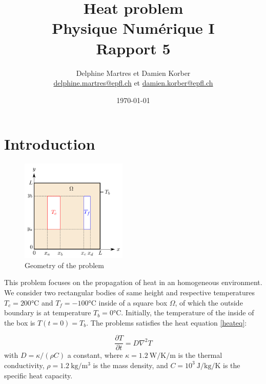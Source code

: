 \documentclass[a4paper,12pt,twoside]{article}
\newcommand{\mail}[1]{{\href{mailto:#1}{#1}}}
\begin{document}
\title{Heat problem\\{\small Physique Numérique I}\\{\small Rapport 5}}
\date{\today}
\author{Delphine Martres et Damien Korber\\{\small \mail{delphine.martres@epfl.ch} et \mail{damien.korber@epfl.ch}}}

\maketitle
\tableofcontents %


\baselineskip=16pt
\parindent=15pt
\parskip=5pt
\newpage



\section{Introduction}

\begin{figure}
 \includegraphics[width=0.45\textwidth]{graphs/schema.png}
 \caption{Geometry of the problem \cite{doc-cours}}
 \label{schema}
\end{figure}


This problem focuses on the propagation of heat in an homogeneous environment.
We consider two rectangular bodies of same height and respective temperatures $T_c = 200$°C and $T_f = -100$°C inside of a square box $\Omega$, of which the outside boundary is at temperature $T_b = 0$°C. Initially, the temperature of the inside of the box is $T(t=0) = T_b$. The problems satisfies the heat equation \eqref{heateq}:

\begin{equation}
 \frac{\partial T}{\partial t} = D\nabla ^2 T
 \label{heateq}
\end{equation}
with $D=\kappa/(\rho C)$ a constant, where $\kappa=1.2~\si{\W \per \K \per \m}$ is the thermal conductivity, $\rho=1.2~\si{\kg \per \m^3}$ is the mass density, and $C=10^3~\si{\J \per \kg \per \K}$ is the specific heat capacity.
\end{document}
